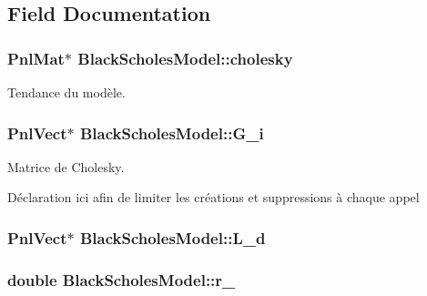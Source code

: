\subsection{Field Documentation}
\hypertarget{classBlackScholesModel_a24f36715c6f6b87de76c6fb3067e4e2f}{
\subsubsection[{cholesky}]{\setlength{\rightskip}{0pt plus 5cm}Pnl\-Mat$\ast$ Black\-Scholes\-Model\-::cholesky\hspace{0.3cm}{\ttfamily [protected]}}}\label{classBlackScholesModel_a24f36715c6f6b87de76c6fb3067e4e2f}


Tendance du modèle. 

\hypertarget{classBlackScholesModel_ac790e18c09330dc3e62f77e34f3a64a4}{
\subsubsection[{G\-\_\-i}]{\setlength{\rightskip}{0pt plus 5cm}Pnl\-Vect$\ast$ Black\-Scholes\-Model\-::\-G\-\_\-i\hspace{0.3cm}{\ttfamily [private]}}}\label{classBlackScholesModel_ac790e18c09330dc3e62f77e34f3a64a4}


Matrice de Cholesky. 

Déclaration ici afin de limiter les créations et suppressions à chaque appel \hypertarget{classBlackScholesModel_aae8afe7aed64436e11b245a472135404}{
\subsubsection[{L\-\_\-d}]{\setlength{\rightskip}{0pt plus 5cm}Pnl\-Vect$\ast$ Black\-Scholes\-Model\-::\-L\-\_\-d\hspace{0.3cm}{\ttfamily [private]}}}\label{classBlackScholesModel_aae8afe7aed64436e11b245a472135404}
\hypertarget{classBlackScholesModel_a9b07eb1d8a7ada20e1a723ba19172644}{
\subsubsection[{r\-\_\-}]{\setlength{\rightskip}{0pt plus 5cm}double Black\-Scholes\-Model\-::r\-\_\-}}\label{classBlackScholesModel_a9b07eb1d8a7ada20e1a723ba19172644}


